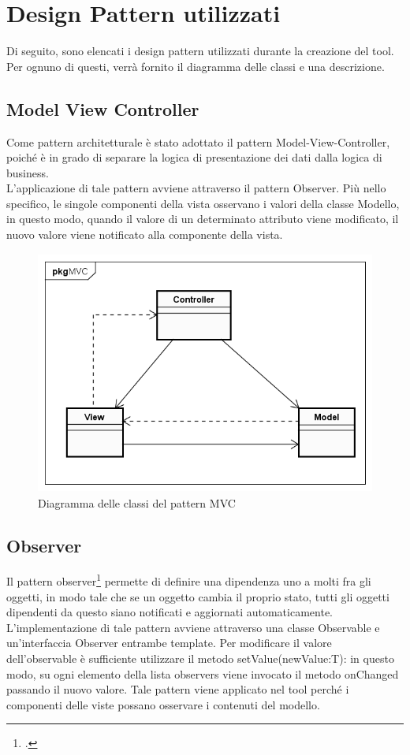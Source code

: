 
\section{Design Pattern utilizzati}\label{sec:design-pattern-utilizzati}
Di seguito, sono elencati i design pattern utilizzati durante la creazione del tool. Per ognuno di questi, verrà fornito il diagramma delle classi e una descrizione.
\subsection{Model View Controller}\label{subsec:model-view-controller}
Come pattern architetturale è stato adottato il pattern Model-View-Controller, poiché è in grado di separare la logica di presentazione dei dati dalla logica di business.\\
L'applicazione di tale pattern avviene attraverso il pattern Observer.
Più nello specifico, le singole componenti della vista osservano i valori della classe Modello, in questo modo, quando il valore di un determinato attributo viene modificato, il nuovo valore viene notificato alla componente della vista.

\begin{figure}[H]
    \centering
    \includegraphics[width=13cm, height=8cm]{./immagini/diagrammi_uml/mvc.png}
    \caption{Diagramma delle classi del pattern MVC}\label{fig:mvc}
\end{figure}

\newpage
\subsection{Observer}\label{subsec:observer}
Il pattern observer\footcite{womak:observer} permette di definire una dipendenza uno a molti fra gli
oggetti, in modo tale che se un oggetto cambia il proprio stato, tutti gli oggetti
dipendenti da questo siano notificati e aggiornati automaticamente.
L'implementazione di tale pattern avviene attraverso una classe Observable e un'interfaccia Observer entrambe template.
Per modificare il valore dell'observable è sufficiente utilizzare il metodo setValue(newValue:T): in questo modo, su ogni elemento della lista observers viene invocato il metodo onChanged passando il nuovo valore.
Tale pattern viene applicato nel tool perché i componenti delle viste possano osservare i contenuti del modello.


